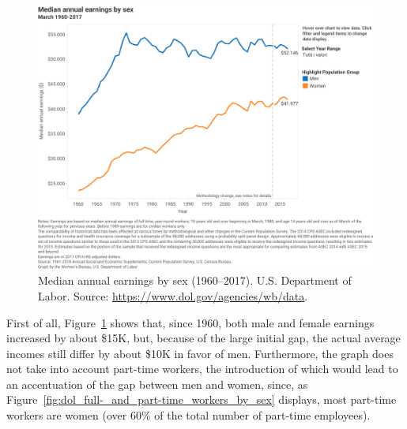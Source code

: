 \begin{figure}[t!]
\includegraphics[scale=.7]{figures/dol_earnings_by_sex.pdf}
\centering
\caption{Median annual earnings by sex (1960--2017).\newline
U.S. Department of Labor. Source: \upshape\protect\url{https://www.dol.gov/agencies/wb/data}.}
\label{fig:dol_earnings_by_sex}
\end{figure}

First of all, Figure~\ref{fig:dol_earnings_by_sex} shows that, since 1960, both male and female earnings increased by about \$15K, but, because of the large initial gap, the actual average incomes still differ by about \$10K in favor of men. Furthermore, the graph does not take into account part-time workers, the introduction of which would lead to an accentuation of the gap between men and women, since, as Figure~\ref{fig:dol_full-_and_part-time_workers_by_sex} displays, most part-time workers are women (over 60\% of the total number of part-time employees).

